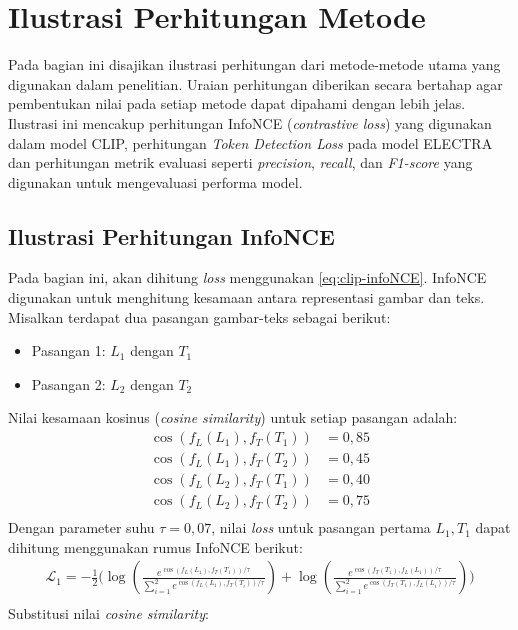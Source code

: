 \section{Ilustrasi Perhitungan Metode} \label{sec:ilustrasi_perhitungan_metode}
Pada bagian ini disajikan ilustrasi perhitungan dari metode-metode utama yang digunakan dalam penelitian. Uraian perhitungan diberikan secara bertahap agar  pembentukan nilai pada setiap metode dapat dipahami dengan lebih jelas. Ilustrasi ini mencakup perhitungan InfoNCE (\textit{contrastive loss}) yang digunakan dalam model CLIP, perhitungan \textit{Token Detection Loss} pada model ELECTRA dan perhitungan metrik evaluasi seperti \textit{precision}, \textit{recall}, dan \textit{F1-score} yang digunakan untuk mengevaluasi performa model.


\subsection{Ilustrasi Perhitungan InfoNCE} \label{subsec:ilustrasi_perhitungan_infonce}
Pada bagian ini, akan dihitung \textit{loss} menggunakan \ref{eq:clip-infoNCE}. InfoNCE digunakan untuk menghitung kesamaan antara representasi gambar dan teks. 
Misalkan terdapat dua pasangan gambar-teks sebagai berikut:
\begin{itemize}
    \item Pasangan 1: $L_1$ dengan $T_1$
    \item Pasangan 2: $L_2$ dengan $T_2$
\end{itemize}

\medskip
Nilai kesamaan kosinus (\textit{cosine similarity}) untuk setiap pasangan adalah:
\bigskip
\begin{align*}
    \cos(f_L(L_1), f_T(T_1)) &= 0{,}85 \\
    \cos(f_L(L_1), f_T(T_2)) &= 0{,}45 \\
    \cos(f_L(L_2), f_T(T_1)) &= 0{,}40 \\
    \cos(f_L(L_2), f_T(T_2)) &= 0{,}75 \\
\end{align*}
Dengan parameter suhu $\tau = 0{,}07$, nilai \textit{loss} untuk pasangan pertama $L_1, T_1$ dapat dihitung menggunakan rumus InfoNCE berikut:\\
\bigskip
\begin{align*}
\mathcal{L}_1 = - \frac{1}{2} \Bigg(
    \log \left( \frac{e^{\cos(f_L(L_1), f_T(T_1)) / \tau}}
    {\sum_{i=1}^{2} e^{\cos(f_L(L_1), f_T(T_i)) / \tau}} \right)
    + \log \left( \frac{e^{\cos(f_T(T_1), f_L(L_1)) / \tau}}
    {\sum_{i=1}^{2} e^{\cos(f_T(T_1), f_L(L_i)) / \tau}} \right)
\Bigg)\\
\end{align*}
Substitusi nilai \textit{cosine similarity}:

